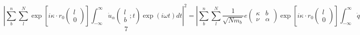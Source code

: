 \documentclass{article}
\begin{document}
\[\left|\sum _{b}^{n}\sum _{l}^{N}\exp \left[i\kappa \cdot r_{0} (\begin{array}{c} {l} \\ {0} \end{array})\right]\int _{-\infty }^{\infty }\dot{u}_{\alpha } \left(\begin{array}{c} {l} \\ {b} \end{array};t\right)\exp (i\omega t)dt   \right|^{2} =\left|\sum _{b}^{n}\sum _{l}^{N}\frac{1}{\sqrt{Nm_{b} } } e\left(\begin{array}{cc} {\kappa } & {b} \\ {\nu } & {\alpha } \end{array}\right)\exp \left[i\kappa \cdot r_{0} (\begin{array}{c} {l} \\ {0} \end{array})\right] \int _{-\infty }^{\infty }\dot{q}\left(\begin{array}{c} {\kappa } \\ {\nu } \end{array};t\right)\exp (i\omega t)dt  \right|^{2} \]
\[7\]


\noindent

\noindent

\noindent

\noindent

\noindent

\noindent

\noindent

\noindent

\noindent
\end{document}

